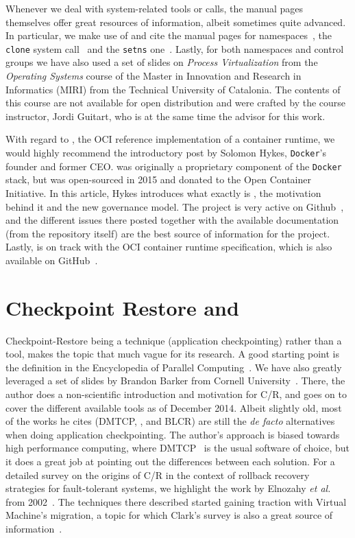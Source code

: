Whenever we deal with system-related tools or calls, the manual pages themselves offer great resources of information, albeit sometimes quite advanced.
In particular, we make use of and cite the manual pages for namespaces~\cite{namespaces-manual}, the \texttt{clone} system call~\cite{clone-manual} and the \texttt{setns} one~\cite{setns-manual}.
Lastly, for both namespaces and control groups we have also used a set of slides on \textit{Process Virtualization} from the \textit{Operating Systems} course of the Master in Innovation and Research in Informatics (MIRI) from the Technical University of Catalonia.
The contents of this course are not available for open distribution and were crafted by the course instructor, Jordi Guitart, who is at the same time the advisor for this work.

With regard to \runc, the OCI reference implementation of a container runtime, we would highly recommend the introductory post by Solomon Hykes, \texttt{Docker}'s founder and former CEO.
\runc was originally a proprietary component of the \texttt{Docker} stack, but was open-sourced in 2015 and donated to the Open Container Initiative.
In this article, Hykes introduces what exactly is \runc, the motivation behind it and the new governance model.
The project is very active on Github~\cite{runc-memtrack}, and the different issues there posted together with the available documentation (from the repository itself) are the best source of information for the project.
Lastly, \runc is on track  with the OCI container runtime specification, which is also available on GitHub~\cite{runc-spec}.

\section{Checkpoint Restore and \criu} \label{sec:rw-criu}

Checkpoint-Restore being a technique (application checkpointing) rather than a tool, makes the topic that much vague for its research.
A good starting point is the definition in the Encyclopedia of Parallel Computing~\cite{Schulz2011}.
We have also greatly leveraged a set of slides by Brandon Barker from Cornell University~\cite{Barker2014}.
There, the author does a non-scientific introduction and motivation for C/R, and goes on to cover the different available tools as of December 2014.
Albeit slightly old, most of the works he cites (DMTCP, \criu, and BLCR) are still the \textit{de facto} alternatives when doing application checkpointing.
The author's approach is biased towards high performance computing, where DMTCP~\cite{dmtcp} is the usual software of choice, but it does a great job at pointing out the differences between each solution.
For a detailed survey on the origins of C/R in the context of rollback recovery strategies for fault-tolerant systems, we highlight the work by Elnozahy \textit{et al.} from 2002~\cite{Elnozahy2002}.
The techniques there described started gaining traction with Virtual Machine's migration, a topic for which Clark's survey is also a great source of information~\cite{Clark2005}.

